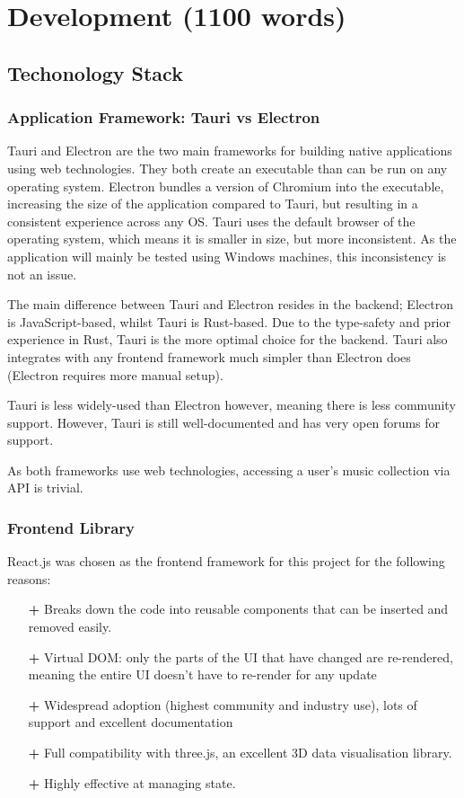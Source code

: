 \chapter{Development (1100 words)}
\section{Techonology Stack}
\subsection{Application Framework: Tauri vs Electron}
Tauri and Electron are the two main frameworks for building native applications using web technologies. They both create an executable than can be run on any operating system. Electron bundles a version of Chromium into the executable, increasing the size of the application compared to Tauri, but resulting in a consistent experience across any OS. Tauri uses the default browser of the operating system, which means it is smaller in size, but more inconsistent. As the application will mainly be tested using Windows machines, this inconsistency is not an issue.

The main difference between Tauri and Electron resides in the backend; Electron is JavaScript-based, whilst Tauri is Rust-based. Due to the type-safety and prior experience in Rust, Tauri is the more optimal choice for the backend. Tauri also integrates with any frontend framework much simpler than Electron does (Electron requires more manual setup). 

Tauri is less widely-used than Electron however, meaning there is less community support. However, Tauri is still well-documented and has very open forums for support.

As both frameworks use web technologies, accessing a user's music collection via API is trivial.

\subsection{Frontend Library}
React.js was chosen as the frontend framework for this project for the following reasons:\begin{itemize}
    \item[\textbf{+}] Breaks down the code into reusable components that can be inserted and removed easily.
    \item[\textbf{+}] Virtual DOM: only the parts of the UI that have changed are re-rendered, meaning the entire UI doesn't have to re-render for any update
    \item[\textbf{+}] Widespread adoption (highest community and industry use), lots of support and excellent documentation
    \item[\textbf{+}] Full compatibility with three.js, an excellent 3D data visualisation library.
    \item[\textbf{+}] Highly effective at managing state.
\end{itemize}

